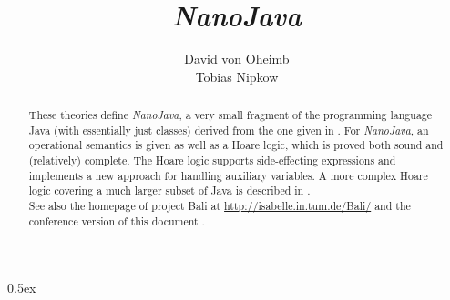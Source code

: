 \documentclass[11pt,a4paper]{article}
\newcommand{\nJava}{\it NanoJava}
\begin{document}
\title{\nJava}
\author{David von Oheimb \\ Tobias Nipkow}
\maketitle

\begin{abstract}\noindent
  These theories define {\nJava}, a very small fragment of the programming 
  language Java (with essentially just classes) derived from the one given 
  in \cite{NipkowOP00}.
  For {\nJava}, an operational semantics is given as well as a Hoare logic,
  which is proved both sound and (relatively) complete. 
  The Hoare logic supports side-effecting expressions and
  implements a new approach for handling auxiliary variables.
  A more complex Hoare logic covering a much larger subset of Java is described
  in \cite{DvO-CPE01}.\\
See also the homepage of project Bali at \url{http://isabelle.in.tum.de/Bali/}
and the conference version of this document \cite{NanoJava}.
\end{abstract}

\tableofcontents
\parindent 0pt \parskip 0.5ex

\newpage


\newpage
\nocite{*}


\end{document}
